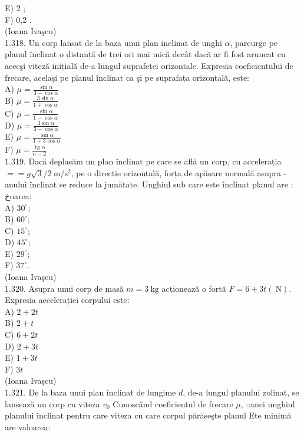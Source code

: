 \documentclass[10pt]{article}
\begin{document}
E) 2 ;\\
F) 0,2 .\\
(Ioana Ivaşcu)\\
1.318. Un corp lansat de la baza unui plan inclinat de unghi $\alpha$, parcurge pe planul înclinat o distanță de trei ori mai mică decât dacă ar fi fost aruncat cu aceeşi viteză inițială de-a lungul suprafeței orizontale. Expresia coeficientului de frecare, acelaşi pe planul înclinat ca şi pe suprafața orizontală, este:\\
A) $\mu=\frac{\sin \alpha}{3-\cos \alpha}$\\
B) $\mu=\frac{3 \sin \alpha}{1+\cos \alpha}$\\
C) $\mu=\frac{\sin \alpha}{1-\cos \alpha}$\\
D) $\mu=\frac{3 \sin \alpha}{3-\cos \alpha}$\\
E) $\mu=\frac{\sin \alpha}{1+3 \cos \alpha}$\\
F) $\mu=\frac{\operatorname{tg} \alpha}{n-2}$\\
1.319. Dacă deplasăm un plan înclinat pe care se află un corp, cu accelerația $==g \sqrt{3} / 2 \mathrm{~m} / \mathrm{s}^{2}$, pe o directie orizontală, forța de apăsare normală asupra - anului înclinat se reduce la jumătate. Unghiul sub care este înclinat planul are : خoarea:\\
A) $30^{\circ}$;\\
B) $60^{\circ}$;\\
C) $15^{\circ}$;\\
D) $45^{\circ}$;\\
E) $29^{\circ}$;\\
F) $37^{\circ}$.\\
(Ioana Ivaşcu)\\
1.320. Asupra unui corp de masă $m=3 \mathrm{~kg}$ acționează o fortă $F=6+3 t(\mathrm{~N})$. Expresia accelerației corpului este:\\
A) $2+2 t$\\
B) $2+t$\\
C) $6+2 t$\\
D) $2+3 t$\\
E) $1+3 t$\\
F) $3 t$\\
(Ioana Ivaşcu)\\
1.321. De la baza unui plan înclinat de lungime $d$, de-a lungul planului zolinat, se lansează un corp cu viteza $v_{0}$ Cunoscând coeficientul de frecare $\mu$, ::anci unghiul planului înclinat pentru care viteza cu care corpul părăseşte planul Ete minimă are valoarea:\\
\end{document}
